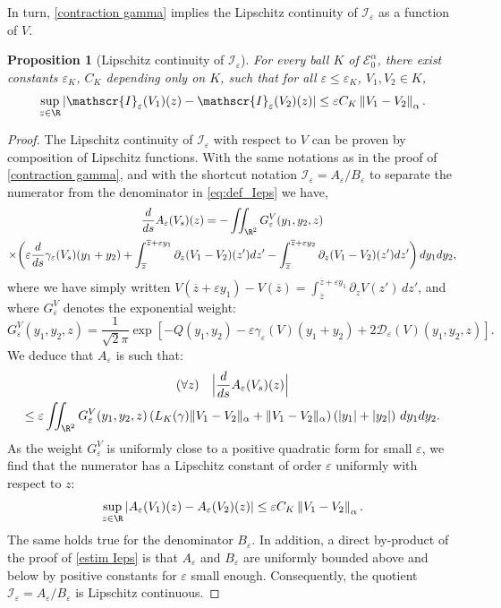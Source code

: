 \documentclass[10pt]{amsart}
\let\mathcal\mathscr
\newcommand{\cI}{\mathcal{I}}
\theoremstyle{plain}
\newtheorem{prop}[thm]{Proposition}
\theoremstyle{definition}
\newcommand{\D}{\mathcal{D}_\eps}
\let\eps\varepsilon
\let\ds\displaystyle
\newcommand{\abs}[1]{\left\lvert#1\right\rvert}
\newcommand{\nalph}[1]{\left\lVert#1\right\rVert_\alpha}
\newcommand{\Eaz}{\mathcal{E}^\alpha_0}
\newcommand{\QV}{G_\eps^V}
\newcommand{\bz}{\overline{z}}
\newcommand{\Cgamma}{L_K(\gamma)}
\newcommand{\dint}{\displaystyle \int}
\begin{document}
In turn, \cref{contraction gamma} implies the Lipschitz continuity of $\cI_\eps$ as a function of $V$.

\begin{prop}[Lipschitz continuity of $\cI_\eps$]\label{cont Ieps}
For every ball $K$ of $\Eaz$, there exist constants $\eps_K$, $C_K$ depending only on $K$, such that for all $\eps \leq \eps_K $, $V_1, V_2 \in K$,
\begin{equation}\label{eq:cont_Ieps}
\sup_{z\in \R}\abs{\cI_\eps(V_1)(z)-\cI_\eps(V_2)(z)} \leq \eps C_K \nalph{ V_1 - V_2}.
\end{equation}
\end{prop}
\begin{proof}
The Lipschitz continuity of $\cI_\eps$ with respect to $V$ can be proven by composition of Lipschitz functions. With the same notations as in the proof of \cref{contraction gamma}, and with the shortcut notation $\cI_\eps = A_\eps/B_\eps$ to separate the numerator from the deno\-mi\-nator in \eqref{eq:def_Ieps} we have,
\begin{multline*}
\dfrac{d}{ds} A_\eps(V_s)(z) = - \iint_{\R^2} \QV(y_1,y_2, z)\\
\times \biggl (\eps \dfrac{d}{ds} \gamma_\eps (V_s) (y_1 + y_2)
+ \dint_{\bz}^{\bz+\eps y_1} \partial_z (V_1-V_2)(z') dz' -\dint_{\bz}^{\bz+\eps y_2} \partial_z (V_1-V_2)(z') dz' \biggr) \, dy_1 dy_2,
\end{multline*}
where we have simply written $V(\bz+\eps y_1) - V(\bz) = \int_{\bz}^{\bz+\eps y_1} \partial_z V(z')\, dz'$, and where $\QV$ denotes the exponential weight:
\begin{equation*}
\QV(y_1,y_2, z) = \dfrac1{\sqrt{2}\pi} \ds \exp\left[-Q(y_1,y_2) -\eps\gamma_\eps(V)(y_1+y_2) + 2 \D(V)(y_1,y_2,z) \right].
\end{equation*}
We deduce that $A_\eps$ is such that:
\begin{multline*}
(\forall z)\quad \Bigl | \dfrac{d}{ds} A_\eps(V_s)(z) \Bigr |\\
\leq \eps \iint_{\R^2} \QV(y_1,y_2, z) \left (\Cgamma \| V_1 - V_2\|_\alpha + \| V_1 - V_2\|_\alpha \right) \left (|y_1| + |y_2|\right) \, dy_1 dy_2.
\end{multline*}
As the weight $\QV$ is uniformly close to a positive quadratic form for small $\eps$, we find that the numerator has a Lipschitz constant of order $\eps$ uniformly with respect to $z$:
\begin{equation*}
\sup_{z\in \R}\abs{A_\eps(V_1)(z)-A_\eps(V_2)(z)} \leq \eps C_K \nalph{ V_1 - V_2}.
\end{equation*}
The same holds true for the denominator $B_\eps$. In addition, a direct by-product of the proof of \cref{estim Ieps} is that $A_\eps$ and $B_\eps$ are uniformly bounded above and below by positive constants for $\eps$ small enough. Consequently, the quotient $\cI_\eps = A_\eps/B_\eps$ is Lipschitz continuous.
\end{proof}
\end{document}
